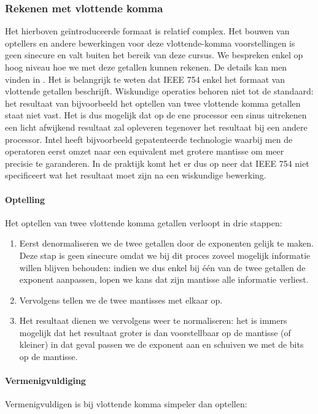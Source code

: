 \subsubsection{Rekenen met vlottende komma}
Het hierboven ge\"introduceerde formaat is relatief complex. Het bouwen van optellers en andere bewerkingen voor deze vlottende-komma voorstellingen is geen sinecure en valt buiten het bereik van deze cursus. We bespreken enkel op hoog niveau hoe we met deze getallen kunnen rekenen. De details kan men vinden in \cite[\S4]{hyde2004write}. Het is belangrijk te weten dat IEEE 754 enkel het formaat van vlottende getallen beschrijft. Wiskundige operaties behoren niet tot de standaard: het resultaat van bijvoorbeeld het optellen van twee vlottende komma getallen staat niet vast. Het is dus mogelijk dat op de ene processor een sinus uitrekenen een licht afwijkend resultaat zal opleveren tegenover het resultaat bij een andere processor. Intel heeft bijvoorbeeld gepatenteerde technologie waarbij men de operatoren eerst omzet naar een equivalent met grotere mantisse om meer precisie te garanderen. In de praktijk komt het er dus op neer dat IEEE 754 niet specificeert wat het resultaat moet zijn na een wiskundige bewerking.

\paragraph{Optelling}
Het optellen van twee vlottende komma getallen verloopt in drie stappen:

\begin{enumerate}
 \item Eerst denormaliseren we de twee getallen door de exponenten gelijk te maken. Deze stap is geen sinecure omdat we bij dit proces zoveel mogelijk informatie willen blijven behouden: indien we dus enkel bij \'e\'en van de twee getallen de exponent aanpassen, lopen we kans dat zijn mantisse alle informatie verliest.
 \item Vervolgens tellen we de twee mantisses met elkaar op.
 \item Het resultaat dienen we vervolgens weer te normaliseren: het is immers mogelijk dat het resultaat groter is dan voorstellbaar op de mantisse (of kleiner) in dat geval passen we de exponent aan en schuiven we met de bits op de mantisse.
\end{enumerate}

\paragraph{Vermenigvuldiging}
Vermenigvuldigen is bij vlottende komma simpeler dan optellen:

